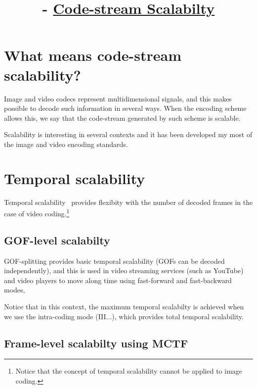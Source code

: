 


\title{\SM{} -  \href{https://github.com/Sistemas-Multimedia/Sistemas-Multimedia.github.io/tree/master/contents/data_scalability}{Code-stream Scalabilty}}

\maketitle
\tableofcontents

\section{What means code-stream scalability?}

Image and video codecs represent multidimensional signals, and this
makes possible to decode such information in several ways. When the
encoding scheme allows this, we say that the code-stream generated by
such scheme is scalable.

Scalability is interesting in several contexts and it has been
developed my most of the image and video encoding standards.


\section{Temporal scalability}


Temporal scalability~\cite{vruiz__video_scalability} provides
flexibity with the number of decoded frames in the case of video
coding.\footnote{Notice that the concept of temporal scalability
  cannot be applied to image coding.}

\subsection{GOF-level scalabilty}
GOF-splitting provides basic temporal scalability (GOFs can be decoded
independently), and this is used in video streaming services (such as
YouTube) and video players to move along time using fast-forward and
fast-backward modes,
  
Notice that in this context, the maximum temporal scalabilty is
achieved when we use the intra-coding mode (III...), which provides
total temporal scalability.

\subsection{Frame-level scalabilty using MCTF}

